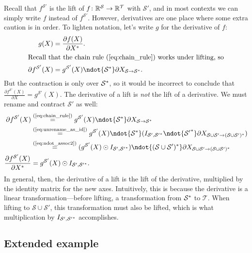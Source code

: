 Recall that $f^\mathcal{S'}$ is the lift of $f \colon \mathbb{R}^\mathcal{S} \rightarrow \mathbb{R}^\mathcal{T}$ with $\mathcal{S'}$, and in most contexts we can simply write $f$ instead of $f^\mathcal{S'}$. However, derivatives are one place where some extra caution is in order.
To lighten notation, let's write $g$ for the derivative of $f$:
\begin{align*}
  g(X) &= \ddx{f(X)}. \\
\intertext{Recall that the chain rule (\ref{eq:chain_rule}) works under lifting, so}
  \partial f^{\mathcal{S'}} (X) &= g^{\mathcal{S'}}(X) \ndot{\mathcal{S}\inax} \partial X_{\mathcal{S}\rightarrow\mathcal{S}\inax}.
\end{align*}
But the contraction is only over $\mathcal{S}^*$, so it would be incorrect to conclude that $\frac{\partial f^{\mathcal{S'}}(X)}{\partial X} = g^{\mathcal{S'}}(X)$. The derivative of a lift is \emph{not} the lift of a derivative. We must rename and contract $\mathcal{S'}$ as well:
\begin{align*}
  \partial f^{\mathcal{S'}} (X)
  &\eqby{eq:chain_rule} g^{\mathcal{S'}}(X) \ndot{\mathcal{S}\inax} \partial X_{\mathcal{S}\rightarrow\mathcal{S}\inax} \\
  &\eqby{eq:unrename_as_id} g^{\mathcal{S'}}(X) \ndot{\mathcal{S}\inax} (I_{\mathcal{S'},\mathcal{S'}\inax} \ndot{\mathcal{S'}\inax} \partial X_{\mathcal{S}\cup\mathcal{S'}\rightarrow(\mathcal{S}\cup\mathcal{S'})\inax}) \\
  &\eqby{eq:ndot_assoc2} (g^{\mathcal{S'}}(X) \odot I_{\mathcal{S'},\mathcal{S'}\inax}) \ndot{(\mathcal{S}\cup\mathcal{S'})\inax} \partial X_{\mathcal{S}\cup\mathcal{S'}\rightarrow(\mathcal{S}\cup\mathcal{S'})\inax} \\
  \frac{\partial f^{\mathcal{S'}} (X)}{\partial X\inax}
  &= g^{\mathcal{S'}}(X) \odot I_{\mathcal{S'}, \mathcal{S'}\inax}.
\end{align*}
In general, then, the derivative of a lift is the lift of the derivative, multiplied by the identity matrix for the new axes.
Intuitively, this is because the derivative is a linear transformation---before lifting, a transformation from $\mathcal{S}^*$ to $\mathcal{T}$. When lifting to $\mathcal{S} \cup \mathcal{S}'$, this transformation must also be lifted, which is what multiplication by $I_{\mathcal{S}',\mathcal{S'}^*}$ accomplishes.

\subsection{Extended example}


